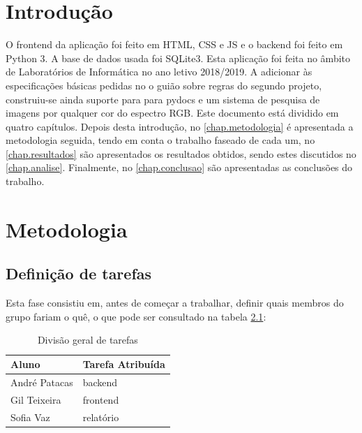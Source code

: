 \documentclass{report}
\begin{document}
\tableofcontents
 \listoftables     %
 \listoffigures    %


\clearpage
{}

\chapter{Introdução}
\label{chap.introducao}

O frontend da aplicação foi feito em \ac{HTML}, \ac{CSS} e \ac{JS} e o
backend foi feito em Python 3. A base de dados usada foi SQLite3. Esta aplicação 
foi feita no âmbito de Laboratórios de Informática no ano letivo 2018/2019.
A adicionar às especificações básicas pedidas no o guião sobre regras do segundo projeto, 
construiu-se ainda suporte para para pydocs e um sistema de pesquisa de imagens por qualquer 
cor do espectro RGB.
Este documento está dividido em quatro capítulos.
Depois desta introdução,
no \autoref{chap.metodologia} é apresentada a metodologia seguida, tendo em conta o trabalho faseado de cada um, 
no \autoref{chap.resultados} são apresentados os resultados obtidos,
sendo estes discutidos no \autoref{chap.analise}.
Finalmente, no \autoref{chap.conclusao} são apresentadas
as conclusões do trabalho.

\chapter{Metodologia}
\label{chap.metodologia}
\section{Definição de tarefas}
Esta fase consistiu em, antes de começar a trabalhar, definir quais membros do grupo fariam o quê, o que pode ser consultado na tabela \ref{tab:table1}: 
\begin{table}[h!]
\begin{center}
\caption{Divisão geral de tarefas}
\begin{tabular}{l|l}
\hline
\multicolumn{1}{|l|}{Aluno} & \multicolumn{1}{l|}{Tarefa Atribuída} \\ \hline
            André Patacas   & backend                               \\ 
            Gil Teixeira      & frontend                               \\
            Sofia Vaz         & relatório                                
\end{tabular}
\label{tab:table1}
\end{center}
\end{table}
\end{document}
